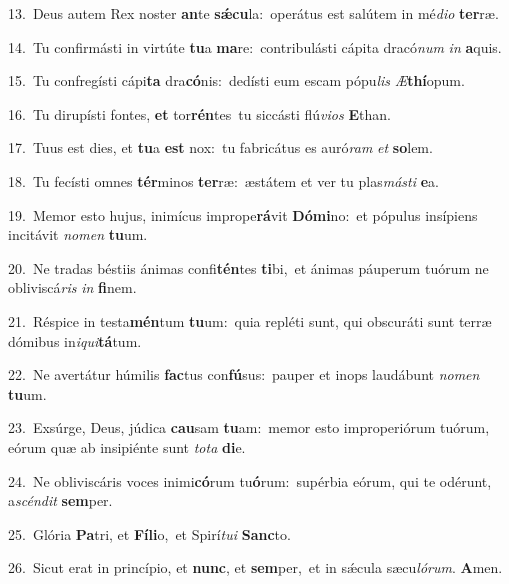 {\numbfont\textcolor{\numbcolor}{13.}}~Deus autem Rex noster \textbf{an}\-te \textbf{sǽ}\-\textbf{cu}la:~\star operátus est salútem in mé\-\textit{di}\-\textit{o} \textbf{ter}\-ræ.\par
{\numbfont\textcolor{\numbcolor}{14.}}~Tu confirmásti in virtúte \textbf{tu}\-a \textbf{ma}\-re:~\star contribulásti cápita dracó\textit{num} \textit{in} \textbf{a}\-quis.\par
{\numbfont\textcolor{\numbcolor}{15.}}~Tu confregísti cápi\textbf{ta} dra\-\textbf{có}\-nis:~\star dedísti eum escam pópu\textit{lis} \textit{Æ}\-\textbf{thí}opum.\par
{\numbfont\textcolor{\numbcolor}{16.}}~Tu dirupísti fontes, \textbf{et} tor\-\textbf{rén}\-tes~\star tu siccásti flú\-\textit{vi}\-\textit{os} \textbf{E}\-than.\par
{\numbfont\textcolor{\numbcolor}{17.}}~Tuus est dies, et \textbf{tu}\-a \textbf{est} nox:~\star tu fabricátus es auró\textit{ram} \textit{et} \textbf{so}\-lem.\par
{\numbfont\textcolor{\numbcolor}{18.}}~Tu fecísti omnes \textbf{tér}\-minos \textbf{ter}\-ræ:~\star æstátem et ver tu plas\-\textit{más}\-\textit{ti} \textbf{e}\-a.\par
{\numbfont\textcolor{\numbcolor}{19.}}~Memor esto hujus, inimícus imprope\-\textbf{rá}\-vit \textbf{Dó}\-\textbf{mi}no:~\star et pópulus insípiens incitávit \textit{no}\-\textit{men} \textbf{tu}\-um.\par
{\numbfont\textcolor{\numbcolor}{20.}}~Ne tradas béstiis ánimas confi\-\textbf{tén}\-tes \textbf{ti}\-bi,~\star et ánimas páuperum tuórum ne obliviscá\textit{ris} \textit{in} \textbf{fi}\-nem.\par
{\numbfont\textcolor{\numbcolor}{21.}}~Réspice in testa\-\textbf{mén}\-tum \textbf{tu}\-um:~\star quia repléti sunt, qui obscuráti sunt terræ dómibus in\-\textit{i}\-\textit{qui}\textbf{tá}tum.\par
{\numbfont\textcolor{\numbcolor}{22.}}~Ne avertátur húmilis \textbf{fac}\-tus con\-\textbf{fú}\-sus:~\star pauper et inops laudábunt \textit{no}\-\textit{men} \textbf{tu}\-um.\par
{\numbfont\textcolor{\numbcolor}{23.}}~Exsúrge, Deus, júdica \textbf{cau}\-sam \textbf{tu}\-am:~\star memor esto improperiórum tuórum, eórum quæ ab insipiénte sunt \textit{to}\-\textit{ta} \textbf{di}\-e.\par
{\numbfont\textcolor{\numbcolor}{24.}}~Ne obliviscáris voces inimi\-\textbf{có}\-rum tu\-\textbf{ó}\-rum:~\star supérbia eórum, qui te odérunt, a\-\textit{scén}\-\textit{dit} \textbf{sem}\-per.\par
{\numbfont\textcolor{\numbcolor}{25.}}~Glória \textbf{Pa}\-tri, et \textbf{Fí}\-\textbf{li}o,~\star et Spirí\-\textit{tu}\-\textit{i} \textbf{Sanc}\-to.\par
{\numbfont\textcolor{\numbcolor}{26.}}~Sicut erat in princípio, et \textbf{nunc}\-, et \textbf{sem}\-per,~\star et in sǽcula sæcu\-\textit{ló}\-\textit{rum}. \textbf{A}\-men.\par

